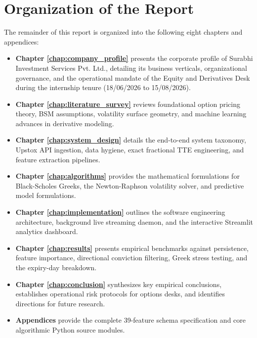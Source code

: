\section{Organization of the Report}
\label{sec:thesis_organization}

The remainder of this report is organized into the following eight chapters and appendices:
\begin{itemize}\setlength{\itemsep}{0pt}\setlength{\parskip}{0pt}
    \item \textbf{Chapter \ref{chap:company_profile}} presents the corporate profile of Surabhi Investment Services Pvt. Ltd., detailing its business verticals, organizational governance, and the operational mandate of the Equity and Derivatives Desk during the internship tenure (18/06/2026 to 15/08/2026).
    \item \textbf{Chapter \ref{chap:literature_survey}} reviews foundational option pricing theory, BSM assumptions, volatility surface geometry, and machine learning advances in derivative modeling.
    \item \textbf{Chapter \ref{chap:system_design}} details the end-to-end system taxonomy, Upstox API ingestion, data hygiene, exact fractional TTE engineering, and feature extraction pipelines.
    \item \textbf{Chapter \ref{chap:algorithms}} provides the mathematical formulations for Black-Scholes Greeks, the Newton-Raphson volatility solver, and predictive model formulations.
    \item \textbf{Chapter \ref{chap:implementation}} outlines the software engineering architecture, background live streaming daemon, and the interactive Streamlit analytics dashboard.
    \item \textbf{Chapter \ref{chap:results}} presents empirical benchmarks against persistence, feature importance, directional conviction filtering, Greek stress testing, and the expiry-day breakdown.
    \item \textbf{Chapter \ref{chap:conclusion}} synthesizes key empirical conclusions, establishes operational risk protocols for options desks, and identifies directions for future research.
    \item \textbf{Appendices} provide the complete 39-feature schema specification and core algorithmic Python source modules.
\end{itemize}
